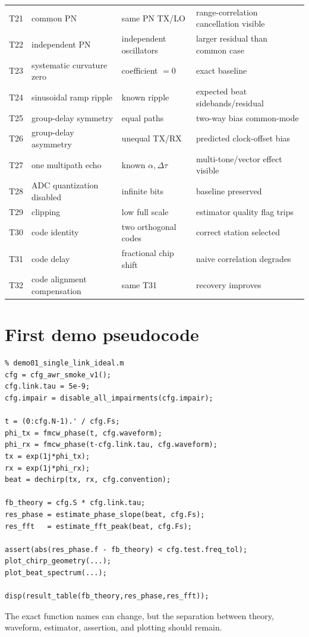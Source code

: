 \documentclass[11pt]{article}
\begin{document}
\begin{longtable}{@{}p{}p{}p{}p{}@{}}
T21 & common PN & same PN TX/LO & range-correlation cancellation visible \\
T22 & independent PN & independent oscillators & larger residual than common case \\
T23 & systematic curvature zero & coefficient $=0$ & exact baseline \\
T24 & sinusoidal ramp ripple & known ripple & expected beat sidebands/residual \\
T25 & group-delay symmetry & equal paths & two-way bias common-mode \\
T26 & group-delay asymmetry & unequal TX/RX & predicted clock-offset bias \\
T27 & one multipath echo & known $\alpha,\Delta\tau$ & multi-tone/vector effect visible \\
T28 & ADC quantization disabled & infinite bits & baseline preserved \\
T29 & clipping & low full scale & estimator quality flag trips \\
T30 & code identity & two orthogonal codes & correct station selected \\
T31 & code delay & fractional chip shift & naive correlation degrades \\
T32 & code alignment compensation & same T31 & recovery improves \\
\bottomrule
\end{longtable}

\section{First demo pseudocode}
\begin{verbatim}
% demo01_single_link_ideal.m
cfg = cfg_awr_smoke_v1();
cfg.link.tau = 5e-9;
cfg.impair = disable_all_impairments(cfg.impair);

t = (0:cfg.N-1).' / cfg.Fs;
phi_tx = fmcw_phase(t, cfg.waveform);
phi_rx = fmcw_phase(t-cfg.link.tau, cfg.waveform);
tx = exp(1j*phi_tx);
rx = exp(1j*phi_rx);
beat = dechirp(tx, rx, cfg.convention);

fb_theory = cfg.S * cfg.link.tau;
res_phase = estimate_phase_slope(beat, cfg.Fs);
res_fft   = estimate_fft_peak(beat, cfg.Fs);

assert(abs(res_phase.f - fb_theory) < cfg.test.freq_tol);
plot_chirp_geometry(...);
plot_beat_spectrum(...);

disp(result_table(fb_theory,res_phase,res_fft));
\end{verbatim}
The exact function names can change, but the separation between theory, waveform, estimator, assertion, and plotting should remain.
\end{document}
